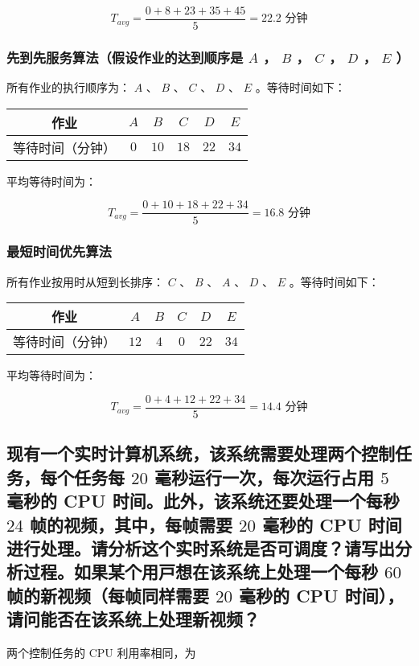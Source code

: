 $$
T_{avg} = \frac{0 + 8 + 23 + 35 + 45}{5} = 22.2 \text{ 分钟}
$$

\subsubsection{
    先到先服务算法（假设作业的达到顺序是 $A$ ， $B$ ， $C$ ， $D$ ， $E$ ）
}

所有作业的执行顺序为： $A$ 、 $B$ 、 $C$ 、 $D$ 、 $E$ 。等待时间如下：

\begin{table}[H]
    \centering
    \begin{tabular}{|c|c|c|c|c|c|}
    \hline
    作业 & $A$ & $B$ & $C$ & $D$ & $E$ \\ \hline
    等待时间（分钟） & $0$  & $10$  & $18$  & $22$  & $34$  \\ \hline
    \end{tabular}
\end{table}

平均等待时间为：

$$
T_{avg} = \frac{0 + 10 + 18 + 22 + 34}{5} = 16.8 \text{ 分钟}
$$

\subsubsection{
    最短时间优先算法
}

所有作业按用时从短到长排序： $C$ 、 $B$ 、 $A$ 、 $D$ 、 $E$ 。等待时间如下：

\begin{table}[H]
    \centering
    \begin{tabular}{|c|c|c|c|c|c|}
    \hline
    作业 & $A$ & $B$ & $C$ & $D$ & $E$ \\ \hline
    等待时间（分钟） & $12$  & $4$  & $0$  & $22$  & $34$  \\ \hline
    \end{tabular}
\end{table}

平均等待时间为：

$$
T_{avg} = \frac{0 + 4 + 12 + 22 + 34}{5} = 14.4 \text{ 分钟}
$$


\subsection{
    现有⼀个实时计算机系统，该系统需要处理两个控制任务，每个任务每 $20$ 毫秒运⾏⼀次，每次运⾏占⽤ $5$ 毫秒的 CPU 时间。此外，该系统还要处理⼀个每秒 $24$ 帧的视频，其中，每帧需要 $20$ 毫秒的 CPU 时间进⾏处理。请分析这个实时系统是否可调度？请写出分析过程。如果某个⽤⼾想在该系统上处理⼀个每秒 $60$ 帧的新视频（每帧同样需要 $20$ 毫秒的 CPU 时间），请问能否在该系统上处理新视频？
}
两个控制任务的 CPU 利用率相同，为

